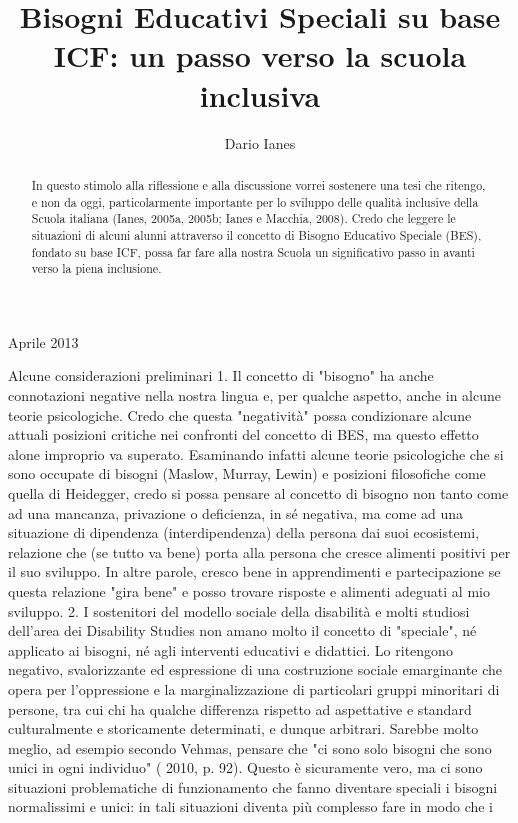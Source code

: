 \author{Dario Ianes}
\title{Bisogni Educativi Speciali su base ICF: un passo verso la scuola inclusiva}
\label{cha:ianes050413}
\begin{abstract}
	In questo stimolo alla riflessione e alla discussione vorrei sostenere una tesi che ritengo, e non
	da oggi, particolarmente importante per lo sviluppo delle qualità inclusive della Scuola italiana
	(Ianes, 2005a, 2005b; Ianes e Macchia, 2008). Credo che leggere le situazioni di alcuni alunni
	attraverso il concetto di Bisogno Educativo Speciale (BES), fondato su base ICF, possa far fare alla
	nostra Scuola un significativo passo in avanti verso la piena inclusione.
\end{abstract}


Aprile 2013

Alcune considerazioni preliminari
1. Il concetto di "bisogno" ha anche connotazioni negative nella nostra lingua e, per qualche
aspetto, anche in alcune teorie psicologiche. Credo che questa "negatività" possa condizionare
alcune attuali posizioni critiche nei confronti del concetto di BES, ma questo effetto alone
improprio va superato. Esaminando infatti alcune teorie psicologiche che si sono occupate di
bisogni (Maslow, Murray, Lewin) e posizioni filosofiche come quella di Heidegger, credo si possa
pensare al concetto di bisogno non tanto come ad una mancanza, privazione o deficienza, in sé
negativa, ma come ad una situazione di dipendenza (interdipendenza) della persona dai suoi
ecosistemi, relazione che (se tutto va bene) porta alla persona che cresce alimenti positivi per il
suo sviluppo. In altre parole, cresco bene in apprendimenti e partecipazione se questa relazione
"gira bene" e posso trovare risposte e alimenti adeguati al mio sviluppo.
2. I sostenitori del modello sociale della disabilità e molti studiosi dell'area dei Disability
Studies non amano molto il concetto di "speciale", né applicato ai bisogni, né agli interventi
educativi e didattici. Lo ritengono negativo, svalorizzante ed espressione di una costruzione sociale
emarginante che opera per l'oppressione e la marginalizzazione di particolari gruppi minoritari di
persone, tra cui chi ha qualche differenza rispetto ad aspettative e standard culturalmente e
storicamente determinati, e dunque arbitrari. Sarebbe molto meglio, ad esempio secondo Vehmas,
pensare che "ci sono solo bisogni che sono unici in ogni individuo" ( 2010, p. 92). Questo è
sicuramente vero, ma ci sono situazioni problematiche di funzionamento che fanno diventare
speciali i bisogni normalissimi e unici: in tali situazioni diventa più complesso fare in modo che i
